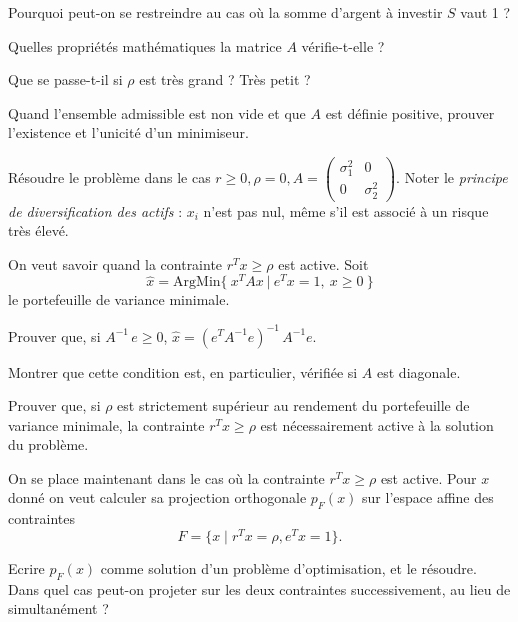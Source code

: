 \documentclass[10pt,a4paper,fleqn]{report}
\begin{document}
\begin{exercice}
\begin{questions}
\item Pourquoi peut-on se restreindre au cas où la somme d'argent à
  investir $S$ vaut 1 ?
\item Quelles propriétés mathématiques la matrice $A$ vérifie-t-elle ?
\item Que se passe-t-il si $\rho$ est très grand ? Très petit ?
\item Quand l'ensemble admissible est non vide et que $A$ est
      d\'efinie positive, prouver l'existence et l'unicit\'e d'un minimiseur.
\item Résoudre le problème dans le cas $r \geq 0, \rho = 0, A =
  \begin{pmatrix}
    \sigma_{1}^{2}&0\\0&\sigma_{2}^{2}
  \end{pmatrix}$. Noter le \textit{principe de diversification des
    actifs} : $x_{i}$ n'est pas nul, même s'il est associé à un risque
  très élevé.
\end{questions}
\end{exercice}

\begin{exercice}
  On veut savoir quand la contrainte $r^{T} x \geq \rho$ est
  active. Soit $$\hat x= \mathrm{ArgMin} \{\ x^{T} A x\ |\ e^{T} x=1, \
  x\geq 0\ \}$$ le portefeuille de variance minimale.
\begin{questions}
\item Prouver que, si $A^{-1}\,e\geq 0$, $\hat x=(e^{T} A^{-1} e)^{-1}\,A^{-1}e$.
\item Montrer que cette condition est, en particulier, v\'erifi\'ee si $A$ est diagonale.
\item Prouver que, si $\rho$ est strictement sup\'erieur au rendement du portefeuille de variance minimale, la contrainte $r^{T} x \geq \rho$ est n\'ecessairement active \`a la solution du probl\`eme.
\end{questions}
\end{exercice}

\begin{exercice}[(projection)]
  On se place maintenant dans le cas où la contrainte $r^{T} x \geq
  \rho$ est active.  Pour $x$ donn\'e on veut calculer sa projection
  orthogonale $p_{F}(x)$ sur l'espace affine des contraintes
  \[F = \{x \; | \; r^{T} x = \rho, e^{T} x = 1\}.\]
  
  Ecrire $p_F(x)$ comme solution d'un problème d'optimisation, et le
  r\'esoudre.  Dans quel cas peut-on projeter sur les deux contraintes
  successivement, au lieu de simultanément ?
\end{exercice}
\end{document}

